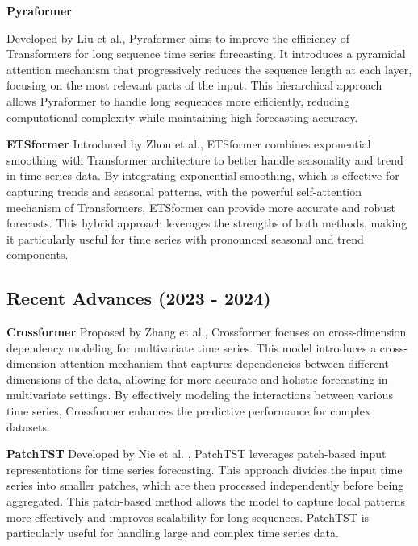 \noindent\textbf
{Pyraformer}

Developed by Liu et al.\cite{liu2022pyraformer}, Pyraformer aims to improve the efficiency of Transformers for long sequence time series forecasting. It introduces a pyramidal attention mechanism that progressively reduces the sequence length at each layer, focusing on the most relevant parts of the input. This hierarchical approach allows Pyraformer to handle long sequences more efficiently, reducing computational complexity while maintaining high forecasting accuracy.
\vspace{10pt}


\noindent\textbf
{ETSformer}
 Introduced by Zhou et al.\cite{woo2022etsformerexponentialsmoothingtransformers}, ETSformer combines exponential smoothing with Transformer architecture to better handle seasonality and trend in time series data. By integrating exponential smoothing, which is effective for capturing trends and seasonal patterns, with the powerful self-attention mechanism of Transformers, ETSformer can provide more accurate and robust forecasts. This hybrid approach leverages the strengths of both methods, making it particularly useful for time series with pronounced seasonal and trend components.
\vspace{10pt}


\subsection{Recent Advances (2023 - 2024)}
\noindent\textbf
{Crossformer}
 Proposed by Zhang et al.\cite{wang2021crossformerversatilevisiontransformer}, Crossformer focuses on cross-dimension dependency modeling for multivariate time series. This model introduces a cross-dimension attention mechanism that captures dependencies between different dimensions of the data, allowing for more accurate and holistic forecasting in multivariate settings. By effectively modeling the interactions between various time series, Crossformer enhances the predictive performance for complex datasets.
\vspace{10pt}


\noindent\textbf
{PatchTST}
 Developed by Nie et al.\cite{nie2023timeseriesworth64} , PatchTST leverages patch-based input representations for time series forecasting. This approach divides the input time series into smaller patches, which are then processed independently before being aggregated. This patch-based method allows the model to capture local patterns more effectively and improves scalability for long sequences. PatchTST is particularly useful for handling large and complex time series data.
\vspace{10pt}


